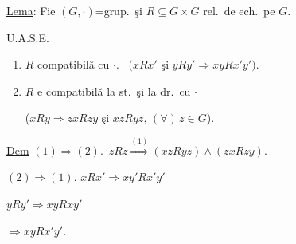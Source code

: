 \documentclass[12pt]{article}
\begin{document}
\bigskip
\noindent\underline{Lema}: Fie $(G,\cdot)$=grup.\ şi $R\subseteq G\times G$ rel.\ de ech.\ pe $G$.

\noindent U.A.S.E.

\begin{enumerate}
\item[(1)] $R$ compatibilă cu $\cdot$. \ $\big(xRx'$ şi $yRy' \Rightarrow xyRx'y'\big)$.
\item[(2)] $R$ e compatibilă la st.\ şi la dr.\ cu $\cdot$

\noindent \big($xRy \Rightarrow zxRzy$ şi $xzRyz$, $(\forall)\,z\in G$\big).
\end{enumerate}

\bigskip
\noindent\underline{Dem} $(1)\Rightarrow(2)$.\ $zRz \overset{(1)}{\Longrightarrow} (xzRyz)\wedge(zxRzy)$.

\bigskip
\noindent $(2) \Rightarrow (1)$. \quad $xRx' \Rightarrow xy'Rx'y'$

\noindent $yRy' \Rightarrow xyRxy'$

\noindent $\Rightarrow xyRx'y'$.
\end{document}

